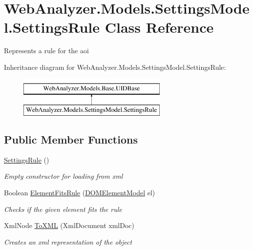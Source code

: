 \hypertarget{class_web_analyzer_1_1_models_1_1_settings_model_1_1_settings_rule}{}\section{Web\+Analyzer.\+Models.\+Settings\+Model.\+Settings\+Rule Class Reference}
\label{class_web_analyzer_1_1_models_1_1_settings_model_1_1_settings_rule}


Represents a rule for the aoi  


Inheritance diagram for Web\+Analyzer.\+Models.\+Settings\+Model.\+Settings\+Rule\+:\begin{figure}[H]
\begin{center}
\leavevmode
\includegraphics[height=2.000000cm]{class_web_analyzer_1_1_models_1_1_settings_model_1_1_settings_rule}
\end{center}
\end{figure}
\subsection*{Public Member Functions}
\begin{DoxyCompactItemize}
\item 
\hyperlink{class_web_analyzer_1_1_models_1_1_settings_model_1_1_settings_rule_ada5165c9c6b7a30cea3b3b9607fe909b}{Settings\+Rule} ()
\begin{DoxyCompactList}\small\item\em Empty constructor for loading from xml \end{DoxyCompactList}\item 
Boolean \hyperlink{class_web_analyzer_1_1_models_1_1_settings_model_1_1_settings_rule_a3969b337984b9bed7741dd778e842d1a}{Element\+Fits\+Rule} (\hyperlink{class_web_analyzer_1_1_models_1_1_data_model_1_1_d_o_m_element_model}{D\+O\+M\+Element\+Model} el)
\begin{DoxyCompactList}\small\item\em Checks if the given element fits the rule \end{DoxyCompactList}\item 
Xml\+Node \hyperlink{class_web_analyzer_1_1_models_1_1_settings_model_1_1_settings_rule_aaee1cf5ecd277bc0ff93b08136c971aa}{To\+X\+M\+L} (Xml\+Document xml\+Doc)
\begin{DoxyCompactList}\small\item\em Creates an xml representation of the object \end{DoxyCompactList}\end{DoxyCompactItemize}
